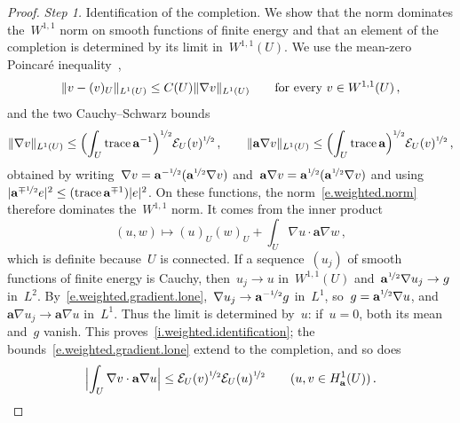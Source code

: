 \documentclass[11pt,letterpaper]{article}
\numberwithin{equation}{section}
\theoremstyle{definition}
\renewcommand{\a}{\mathbf{a}}
\newcommand{\nf}{\nicefrac}
\newcommand*{\tr}{\mathrm{trace\,}}
\DeclarePairedDelimiter{\norm}{\lVert}{\rVert}
\newcommand{\Ener}{\mathcal E}
\begin{document}
\begin{proof}
\emph{Step 1.} Identification of the completion. We show that the norm dominates the~$W^{1,1}$ norm on smooth functions of finite energy and that an element of the completion is determined by its limit in~$W^{1,1}(U)$. We use the mean-zero Poincar\'e inequality~\cite[Lemma 3.24,~$p=1$]{Guermond.traces},
\begin{equation}
	\norm{v-(v)_U}_{L^1(U)}\leq C(U)\norm{\nabla v}_{L^1(U)}\qquad\mbox{for every }v\in W^{1,1}(U)\,,
	\label{e.ordinary.mean.poincare}
\end{equation}
and the two Cauchy--Schwarz bounds
\begin{equation}
	\norm{\nabla v}_{L^1(U)}\leq\Bigl(\int_U\tr\a^{-1}\Bigr)^{\nf12}\Ener_U(v)^{\nf12}\,,\qquad \norm{\a\nabla v}_{L^1(U)}\leq\Bigl(\int_U\tr\a\Bigr)^{\nf12}\Ener_U(v)^{\nf12}\,,
	\label{e.weighted.gradient.lone}
\end{equation}
obtained by writing~$\nabla v=\a^{-\nf12}(\a^{\nf12}\nabla v)$ and~$\a\nabla v=\a^{\nf12}(\a^{\nf12}\nabla v)$ and using~$|\a^{\mp\nf12}e|^2\leq(\tr\a^{\mp1})|e|^2$. On these functions, the norm~\eqref{e.weighted.norm} therefore dominates the~$W^{1,1}$ norm. It comes from the inner product
\begin{equation*}
	(u,w)\mapsto(u)_U(w)_U+\int_U\nabla u\cdot\a\nabla w\,,
\end{equation*}
which is definite because~$U$ is connected. If a sequence~$(u_j)$ of smooth functions of finite energy is Cauchy, then~$u_j\to u$ in~$W^{1,1}(U)$ and~$\a^{\nf12}\nabla u_j\to g$ in~$L^2$. By~\eqref{e.weighted.gradient.lone},~$\nabla u_j\to\a^{-\nf12}g$ in~$L^1$, so~$g=\a^{\nf12}\nabla u$, and~$\a\nabla u_j\to\a\nabla u$ in~$L^1$. Thus the limit is determined by~$u$: if~$u=0$, both its mean and~$g$ vanish. This proves~\ref{i.weighted.identification}; the bounds~\eqref{e.weighted.gradient.lone} extend to the completion, and so does
\begin{equation}
	\Bigl|\int_U\nabla v\cdot\a\nabla u\Bigr|\leq\Ener_U(v)^{\nf12}\Ener_U(u)^{\nf12}\qquad(u,v\in H^1_\a(U))\,.
	\label{e.weighted.pairing}
\end{equation}

\smallskip


\end{proof}
\end{document}
